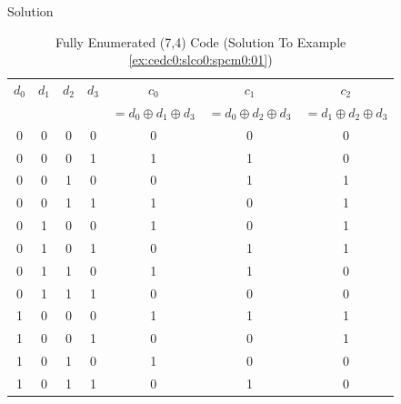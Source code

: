 \begin{vworkexampleparsection}{Solution}
\begin{table}
\caption{Fully Enumerated (7,4) Code (Solution To Example \ref{ex:cedc0:slco0:spcm0:01})}
\label{tbl:ex:cedc0:slco0:spcm0:01:01}
\begin{center}
\begin{tabular}{|c|c|c|c|c|c|c|}
\hline
$d_0$ & $d_1$ & $d_2$ & $d_3$ & $c_0$                        & $c_1$ & $c_2$ \\
      &       &       &       & $=d_0 \oplus d_1 \oplus d_3$ & $=d_0 \oplus d_2 \oplus d_3$ & $=d_1 \oplus d_2 \oplus d_3$ \\
\hline
\hline
  0   &  0    &  0    &  0    &  0                           &  0                           &  0                           \\
\hline
  0   &  0    &  0    &  1    &  1                           &  1                           &  0                           \\
\hline
  0   &  0    &  1    &  0    &  0                           &  1                           &  1                           \\
\hline
  0   &  0    &  1    &  1    &  1                           &  0                           &  1                           \\
\hline
  0   &  1    &  0    &  0    &  1                           &  0                           &  1                           \\
\hline
  0   &  1    &  0    &  1    &  0                           &  1                           &  1                           \\
\hline
  0   &  1    &  1    &  0    &  1                           &  1                           &  0                           \\
\hline
  0   &  1    &  1    &  1    &  0                           &  0                           &  0                           \\
\hline
  1   &  0    &  0    &  0    &  1                           &  1                           &  1                           \\
\hline
  1   &  0    &  0    &  1    &  0                           &  0                           &  1                           \\
\hline
  1   &  0    &  1    &  0    &  1                           &  0                           &  0                           \\
\hline
  1   &  0    &  1    &  1    &  0                           &  1                           &  0                           \\

\end{tabular}
\end{center}
\end{table}
\end{vworkexampleparsection}
